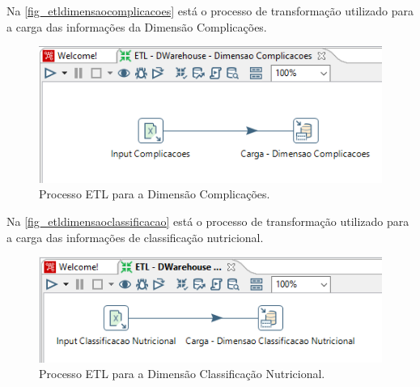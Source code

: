 Na \autoref{fig_etldimensaocomplicacoes} está o processo de transformação utilizado para a carga das informações da Dimensão Complicações.
\begin{figure}[htb]
	\caption{\label{fig_etldimensaocomplicacoes}Processo ETL para a Dimensão Complicações.}
	\begin{center}
	    \includegraphics[scale=0.75]{Imagens/figura - etl dw complicacoes.png}
	\end{center}
\end{figure}

Na \autoref{fig_etldimensaoclassificacao} está o processo de transformação utilizado para a carga das informações de classificação nutricional.
\begin{figure}[htb]
	\caption{\label{fig_etldimensaoclassificacao}Processo ETL para a Dimensão Classificação Nutricional.}
	\begin{center}
	    \includegraphics[scale=0.9]{Imagens/figura - etl dw classificacao.png}
	\end{center}
\end{figure}

